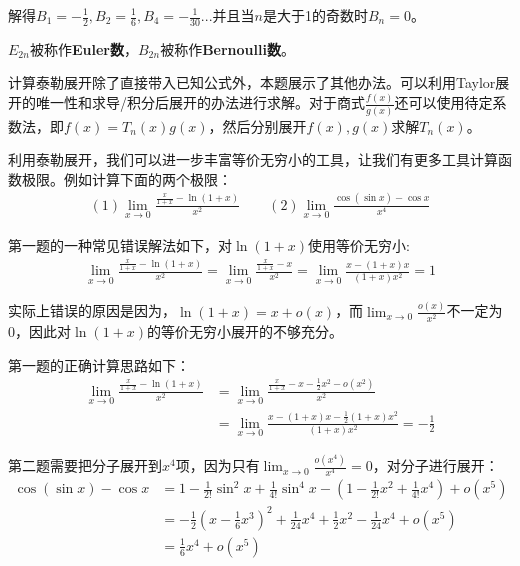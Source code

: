 \documentclass{ctexart}
\let\oldtextbf\textbf %
\renewcommand{\textbf}[1]{\textcolor{btex}{\oldtextbf{#1}}} %
\begin{document}
解得$B_1=-\frac{1}{2},B_2=\frac{1}{6},B_4=-\frac{1}{30}...$并且当$n$是大于1的奇数时$B_n=0$。
\begin{tcolorbox}[
    colback=bac1,     %
    colframe=fra1,   %
    coltitle=white,             %
    coltext=tex1,
    title=小拓展与总结,
    fonttitle=\bfseries,        %
arc=3mm,                     %
breakable
]
$E_{2n}$被称作\textbf{Euler数}，$B_{2n}$被称作\textbf{Bernoulli数}。

计算泰勒展开除了直接带入已知公式外，本题展示了其他办法。可以利用Taylor展开的唯一性和求导/积分后展开的办法进行求解。对于商式$\frac{f(x)}{g(x)}$还可以使用待定系数法，即$f(x)=T_n(x)g(x)$，然后分别展开$f(x),g(x)$求解$T_n(x)$。
\end{tcolorbox}

利用泰勒展开，我们可以进一步丰富等价无穷小的工具，让我们有更多工具计算函数极限。例如计算下面的两个极限：
\begin{align*}
    (1)\lim_{x\to 0}\frac{\frac{x}{1+x}-\ln(1+x)}{x^2}\qquad (2)\lim_{x\to 0}\frac{\cos(\sin x)-\cos x}{x^4}
\end{align*}
\begin{tcolorbox}[
    colback=bac2,     %
    colframe=fra2,   %
    coltitle=white,             %
    coltext=tex2,
    title=一个误区,
    fonttitle=\bfseries,        %
arc=3mm,                     %
breakable
]
第一题的一种常见错误解法如下，对$\ln(1+x)$使用等价无穷小:
\begin{align*}
    \lim_{x\to 0}\frac{\frac{x}{1+x}-\ln(1+x)}{x^2}= \lim_{x\to 0}\frac{\frac{x}{1+x}-x}{x^2}
= \lim_{x\to 0}\frac{x-(1+x)x}{(1+x)x^2}=1
\end{align*}

实际上错误的原因是因为，$\ln(1+x)=x+o(x)$，而$\lim_{x\to 0}\frac{o(x)}{x^2}$不一定为0，因此对$\ln(1+x)$的等价无穷小展开的不够充分。
\end{tcolorbox}

第一题的正确计算思路如下：
\begin{align*}
    \lim_{x\to 0}\frac{\frac{x}{1+x}-\ln(1+x)}{x^2}&= \lim_{x\to 0}\frac{\frac{x}{1+x}-x-\frac{1}{2}x^2-o(x^2) }{x^2}
\\&= \lim_{x\to 0}\frac{x-(1+x)x-\frac{1}{2}(1+x)x^2 }{(1+x)x^2}=-\frac{1}{2}
\end{align*}

第二题需要把分子展开到$x^4$项，因为只有$\lim_{x\to 0}\frac{o(x^4)}{x^4}=0$，对分子进行展开：
\begin{align*}
    \cos(\sin x)-\cos x&=1-\frac{1}{2!}\sin^2x+\frac{1}{4!}\sin^4x-(1-\frac{1}{2!}x^2+\frac{1}{4!}x^4)+o(x^5)\\
&=-\frac{1}{2}(x-\frac{1}{6}x^3)^2+\frac{1}{24}x^4+\frac{1}{2}x^2-\frac{1}{24}x^4+o(x^5)\\
&=\frac{1}{6}x^4+o(x^5)          
\end{align*}
\end{document}
